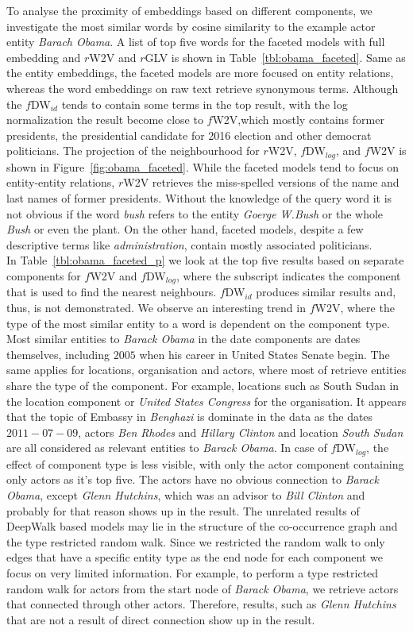 To analyse the proximity of embeddings based on different components, we investigate the most similar words by cosine similarity to the example actor entity \emph{Barach Obama}. A list of top five words for the faceted models with full embedding and $r$W2V and $r$GLV is shown in Table~\ref{tbl:obama_faceted}. Same as the entity embeddings, the faceted models are more focused on entity relations, whereas the word embeddings on raw text retrieve synonymous terms. Although the $f$DW$_{id}$ tends to contain some terms in the top result, with the log normalization the result become close to $f$W2V,which mostly contains former presidents, the presidential candidate for 2016 election and other democrat politicians. The projection of the neighbourhood for $r$W2V, $f$DW$_{log}$, and $f$W2V is shown in Figure~\ref{fig:obama_faceted}. While the faceted models tend to focus on entity-entity relations, $r$W2V retrieves the miss-spelled versions of the name and last names of former presidents. Without the knowledge of the query word it is not obvious if the word \emph{bush} refers to the entity \emph{Goerge W.Bush} or the whole \emph{Bush} or even the plant. On the other hand, faceted models, despite a few descriptive terms like \emph{administration}, contain mostly associated politicians.\\
 In Table~\ref{tbl:obama_faceted_p} we look at the top five results based on separate components for $f$W2V and $f$DW$_{log}$, where the subscript indicates the component that is used to find the nearest neighbours. $f$DW$_{id}$ produces similar results and, thus, is not demonstrated. We observe an interesting trend in $f$W2V, where the type of the most similar entity to a word is dependent on the component type. Most similar entities to \emph{Barack Obama} in the date components are dates themselves, including $2005$ when his career in United States Senate begin. The same applies for locations, organisation and actors, where most of retrieve entities share the type of the component. For example, locations such as South Sudan in the location component or  \emph{United States Congress} for the organisation. It appears that the topic of Embassy in  \emph{Benghazi} is dominate in the data as the dates $2011-07-09$, actors  \emph{Ben Rhodes} and  \emph{Hillary Clinton} and location  \emph{South Sudan} are all considered as relevant entities to \emph{Barack Obama}. In case of $f$DW$_{log}$, the effect of component type is less visible, with only the actor component containing only actors as it's top five. The actors have no obvious connection to \emph{Barack Obama}, except \emph{Glenn Hutchins}, which was an advisor to \emph{Bill Clinton} and probably for that reason shows up in the result. The unrelated results of DeepWalk based models may lie in the structure of the co-occurrence graph and the type restricted random walk. Since we restricted the random walk to only edges that have a specific entity type as the end node for each component we focus on very limited information. For example, to perform a type restricted random walk for actors from the start node of  \emph{Barack Obama}, we retrieve actors that connected through other actors. Therefore, results, such as \emph{Glenn Hutchins} that are not a result of direct connection show up in the result.

